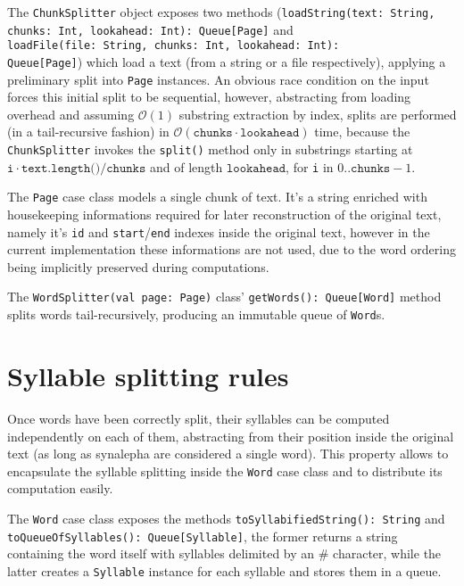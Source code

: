 The \texttt{ChunkSplitter} object exposes two methods (\texttt{loadString(text: String, chunks: Int, lookahead: Int): Queue[Page]} and\\ \texttt{loadFile(file: String, chunks: Int, lookahead: Int):\\ Queue[Page]}) which load a text (from a string or a file respectively), applying a preliminary split into \texttt{Page} instances. An obvious race condition on the  input forces this initial split to be sequential, however, abstracting from loading overhead and assuming $\mathcal{O}(1)$ substring extraction by index, splits are performed (in a tail-recursive fashion) in $\mathcal{O}(\texttt{chunks} \cdot \texttt{lookahead})$ time, because the \texttt{ChunkSplitter} invokes the \texttt{split()} method only in substrings starting at $\texttt{i} \cdot \texttt{text.length()} / \texttt{chunks}$ and of length $\texttt{lookahead}$, for \texttt{i} in $0 .. \texttt{chunks} - 1$.

The \texttt{Page} case class models a single chunk of text. It's a string enriched with housekeeping informations required for later reconstruction of the original text, namely it's \texttt{id} and \texttt{start}/\texttt{end} indexes inside the original text, however in the current implementation these informations are not used, due to the word ordering being implicitly preserved during computations.

The \texttt{WordSplitter(val page: Page)} class' \texttt{getWords(): Queue[Word]} method splits words tail-recursively, producing an immutable queue of \texttt{Word}s.

\section{Syllable splitting rules}
Once words have been correctly split, their syllables can be computed independently on each of them, abstracting from their position inside the original text (as long as synalepha are considered a single word).
This property allows to encapsulate the syllable splitting inside the \texttt{Word} case class and to distribute its computation easily.

The \texttt{Word} case class exposes the methods \texttt{toSyllabifiedString(): String} and \texttt{toQueueOfSyllables(): Queue[Syllable]}, the former returns a string containing the word itself with syllables delimited by an $\#$ character, while the latter creates a \texttt{Syllable} instance for each syllable and stores them in a queue.

